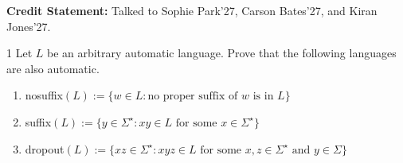 \documentclass[12pt]{article}
\begin{document}


\textbf{Credit Statement:} Talked to Sophie Park'27, Carson Bates'27, and Kiran Jones'27. 

\begin{problem}{1}
    Let $L$ be an arbitrary automatic language. Prove that the following languages are also automatic.

    \begin{enumerate}
        \item  nosuffix$(L) := \{w \in L: \text{no proper suffix of $w$ is in $L$}\}$
        \item suffix$(L) := \{y \in \Sigma^\star: x y \in L \text{ for some } x \in \Sigma^\star\}$
        \item dropout$(L) := \{xz \in \Sigma^\star: xyz \in L \text{ for some } x, z \in \Sigma^\star \text{ and } y \in \Sigma\}$
    \end{enumerate}
\end{problem}
\end{document}
